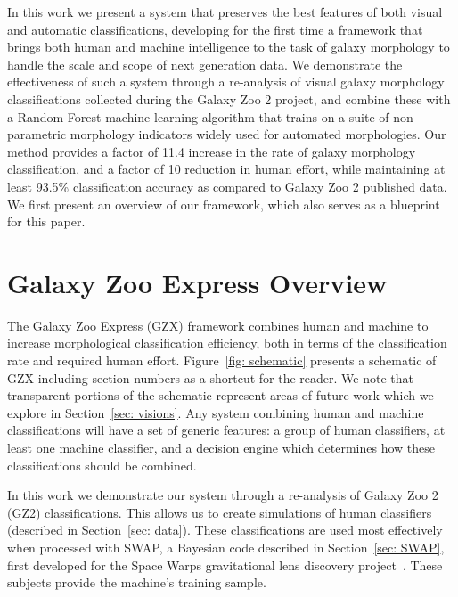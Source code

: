 \documentclass[twocolumn]{aastex6}
\begin{document}
In this work we present a system that preserves the best features of both visual and 
automatic classifications, developing for the first time a framework that brings both 
human and machine intelligence to the task of galaxy morphology to handle the 
scale and scope of next generation data. We demonstrate the effectiveness of such 
a system through a re-analysis of visual galaxy morphology classifications collected 
during the Galaxy Zoo 2 project, and combine these with a Random Forest
machine learning algorithm that trains on a suite of non-parametric morphology 
indicators widely used for automated morphologies. 
Our method provides a factor of 11.4 increase in the rate of galaxy morphology
classification, and a factor of 10 reduction in human effort, while maintaining 
at least 93.5\% classification accuracy as compared to Galaxy Zoo 2 published data. 
We first present an overview of our framework, which also serves as a blueprint for this paper. 


\section{Galaxy Zoo Express Overview}

The Galaxy Zoo Express (GZX) framework combines human and machine to 
increase morphological classification efficiency, both in terms of the 
classification rate and required human effort. 
Figure~\ref{fig: schematic} presents a schematic of GZX including section 
numbers as a shortcut for the reader. We note that transparent portions
 of the schematic represent areas of future work which we explore in Section~\ref{sec: visions}. 
Any system combining human and machine classifications will have a set of generic 
features: a group of human classifiers, at least one machine classifier, and a 
decision engine which determines how these classifications should be combined.

In this work we demonstrate our system through a re-analysis of  Galaxy Zoo 2 (GZ2) classifications. 
This allows us to  create simulations of human classifiers (described in Section~\ref{sec: data}).
These classifications are used most effectively when processed with SWAP, 
a Bayesian code described in Section~\ref{sec: SWAP}, first developed for the 
Space Warps gravitational lens discovery project~\citep{Marshall2016}. 
These subjects provide the machine's training sample. 
\end{document}
